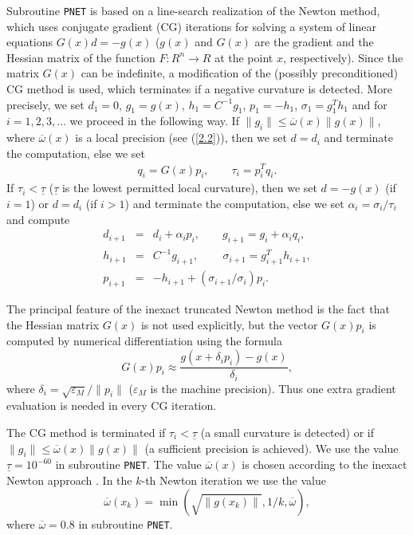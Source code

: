 \documentclass{esub2acm}
\newcommand{\be}{\begin{equation}}
\newcommand{\ee}{\end{equation}}
\newcommand{\beq}{\begin{eqnarray*}}
\newcommand{\eeq}{\end{eqnarray*}}
\begin{document}
Subroutine {\tt PNET} is based on a line-search realization of
the Newton method, which uses conjugate gradient (CG) iterations
for solving a system of linear equations $G(x) d = -g(x)$ ($g(x)$
and $G(x)$ are the gradient and the Hessian matrix of the function
$F: R^n \to R$ at the point $x$, respectively). Since the matrix $G(x)$
can be indefinite, a modification of the (possibly preconditioned)
CG method is used, which terminates if a
negative curvature is detected. %
More precisely, we set $d_1 = 0$, $g_1 = g(x)$, $h_1 = C^{-1} g_1$,
$p_1 = -h_1$, $\sigma_1 = g_1^T h_1$ and for $i = 1,2,3, \dots$
we proceed in the following way. If
$\| g_i \| \leq \overline{\omega}(x) \| g(x) \|$, where $\overline{\omega}(x)$
is a local precision (see (\ref{2.2})), then we set $d = d_i$
and terminate the computation, else we set
%
\beq
q_i = G(x) p_i, \qquad \tau_i = p_i^T q_i.
\eeq
%
If $\tau_i < \underline{\tau}$ ($\underline{\tau}$ is the lowest
permitted local curvature), then we set
$d = -g(x)$ (if $i = 1$) or $d = d_i$ (if $i > 1$) and terminate the
computation, else we set $\alpha_i = \sigma_i / \tau_i$ and compute
%
\beq
d_{i+1} & = & d_i + \alpha_i p_i, \qquad
g_{i+1} = g_i + \alpha_i q_i, \\
h_{i+1} & = & C^{-1} g_{i+1}, \qquad \, \sigma_{i+1} = g_{i+1}^T h_{i+1}, \\
p_{i+1} & = & - h_{i+1} + (\sigma_{i+1} / \sigma_i) p_i.
\eeq

The principal feature of the inexact truncated Newton method
is the fact that the Hessian matrix $G(x)$ is not used explicitly,
but the vector $G(x) p_i$ is computed by numerical differentiation
using the formula
%
\be
G(x) p_i \approx \frac{g(x + \delta_i p_i) - g(x)}{\delta_i},
\label{2.1}
\ee
%
where $\delta_i = \sqrt{\varepsilon_M} / \|p_i\|$ ($\varepsilon_M$
is the machine precision). Thus one extra gradient evaluation is
needed in every CG iteration.

The CG method is terminated if $\tau_i < \underline{\tau}$ (a small
curvature is detected) or if $\| g_i \| \leq \overline{\omega}(x) \| g(x) \|$
(a sufficient precision is achieved). We use the value $\underline{\tau} = 10^{-60}$
in subroutine {\tt PNET}. The value $\overline{\omega}(x)$ is chosen according
to the inexact Newton approach \cite{des1}. In the $k$-th Newton
iteration we use the value
%
\be
\overline{\omega}(x_k) = \min\left(\sqrt{\|g(x_k)\|}, 1/k, \overline{\omega}\right),
\label{2.2}
\ee
%
where $\overline{\omega} = 0.8$ in subroutine {\tt PNET}.
\end{document}
